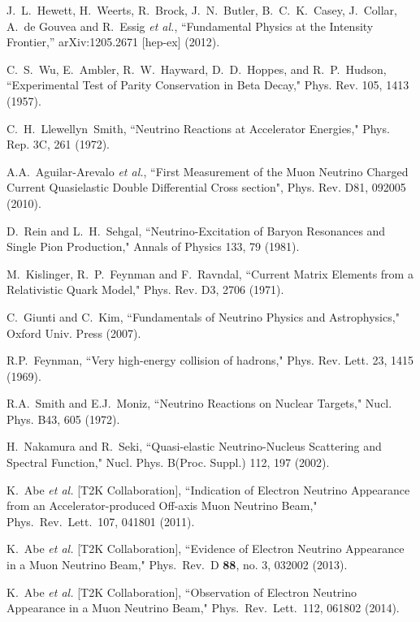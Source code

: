\begin{thebibliography}{30}
\label{sec:references}

  J.~L.~Hewett, H.~Weerts, R.~Brock, J.~N.~Butler, B.~C.~K.~Casey, J.~Collar, A.~de Gouvea and R.~Essig {\it et al.},
  ``Fundamental Physics at the Intensity Frontier,''
  arXiv:1205.2671 [hep-ex] (2012).

 C.~S.~Wu, E.~Ambler, R.~W.~Hayward, D.~D.~Hoppes, and R.~P.~Hudson, 
``Experimental Test of Parity Conservation in Beta Decay," 
Phys. Rev. 105, 1413 (1957).

 C.~H.~Llewellyn~Smith, 
``Neutrino Reactions at Accelerator Energies,"
Phys. Rep. 3C, 261 (1972).

 A.A.~Aguilar-Arevalo {\it et al.}, 
``First Measurement of the Muon Neutrino Charged Current Quasielastic Double Differential Cross section",
Phys. Rev. D81, 092005 (2010).

 D.~Rein and L.~H.~Sehgal,
``Neutrino-Excitation of Baryon Resonances and Single Pion Production,"
 Annals of Physics 133, 79 (1981).

 M.~Kislinger, R.~P.~Feynman and F.~Ravndal,
``Current Matrix Elements from a Relativistic Quark Model,"
 Phys. Rev. D3, 2706 (1971).

 C.~Giunti and C.~Kim,
``Fundamentals of Neutrino Physics and Astrophysics,"
Oxford Univ. Press (2007).

 R.P.~Feynman, 
``Very high-energy collision of hadrons,"
 Phys. Rev. Lett. 23, 1415 (1969).

 R.A.~Smith and E.J.~Moniz,
``Neutrino Reactions on Nuclear Targets,"
Nucl. Phys. B43, 605 (1972).

 H.~Nakamura and R.~Seki,
``Quasi-elastic Neutrino-Nucleus Scattering and Spectral Function,"
Nucl. Phys. B(Proc. Suppl.) 112, 197 (2002).

 K.~Abe {\it et al.}  [T2K Collaboration],
  ``Indication of Electron Neutrino Appearance from an Accelerator-produced Off-axis Muon Neutrino Beam,"
  Phys.\ Rev.\ Lett.\ 107, 041801 (2011).

  K.~Abe {\it et al.}  [T2K Collaboration],
  ``Evidence of Electron Neutrino Appearance in a Muon Neutrino Beam,"
  Phys.\ Rev.\ D {\bf 88}, no. 3, 032002 (2013).

 K.~Abe {\it et al.}  [T2K Collaboration],
 ``Observation of Electron Neutrino Appearance in a Muon Neutrino Beam,"
  Phys.\ Rev.\ Lett.\  112, 061802 (2014).


\end{thebibliography}
